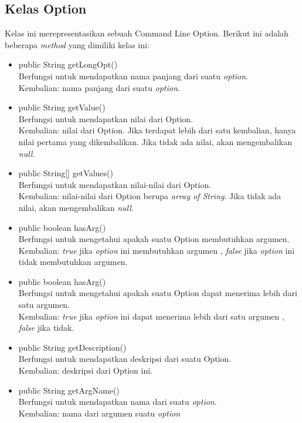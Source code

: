 \subsection{Kelas Option}
\label{subsec:option}
Kelas ini merepresentasikan sebuah Command Line Option. Berikut ini adalah beberapa \textit{method} yang dimiliki kelas ini: 
\begin{itemize}
\item public String getLongOpt()\\
Berfungsi untuk mendapatkan nama panjang dari suatu \textit{option}.\\
Kembalian: nama panjang dari suatu \textit{option}.
\item public String getValue()\\
Berfungsi untuk mendapatkan nilai dari Option.\\
Kembalian: nilai dari Option. Jika terdapat lebih dari satu kembalian, hanya nilai pertama yang dikembalikan. Jika tidak ada nilai, akan mengembalikan \textit{null}.

\item public String[] getValues()\\
Berfungsi untuk mendapatkan nilai-nilai dari Option.\\
Kembalian: nilai-nilai dari Option berupa \textit{array of String}. Jika tidak ada nilai, akan mengembalikan \textit{null}.

\item public boolean hasArg()\\
Berfungsi untuk mengetahui apakah suatu Option membutuhkan argumen.\\
Kembalian: \textit{true} jika \textit{option} ini membutuhkan argumen , \textit{false} jika \textit{option} ini tidak membutuhkan argumen.

\item public boolean hasArg()\\
Berfungsi untuk mengetahui apakah suatu Option dapat menerima lebih dari satu argumen.\\
Kembalian: \textit{true} jika \textit{option} ini dapat menerima lebih dari satu argumen , \textit{false} jika tidak.

\item public String getDescription()\\
Berfungsi untuk mendapatkan deskripsi dari suatu Option.\\
Kembalian: deskripsi dari Option ini.
\item public String getArgName()\\
Berfungsi untuk mendapatkan nama dari suatu \textit{option}.\\
Kembalian: nama dari argumen suatu \textit{option}


\end{itemize}

